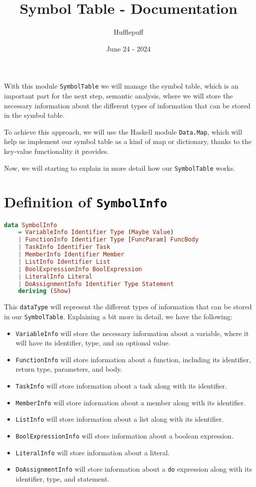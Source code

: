 \documentclass{article}
\title{Symbol Table - Documentation}
\author{Hufflepuff}
\date{June 24 - 2024}
\newcommand{\code}[1]{\colorbox{codebackground}{\texttt{#1}}}
\begin{document}
\maketitle

With this module \code{SymbolTable} we will manage the symbol table, which is an important part for the next step, semantic analysis, where we will store the necessary information about the different types of information that can be stored in the symbol table.

To achieve this approach, we will use the Haskell module \code{Data.Map}, which will help us implement our symbol table as a kind of map or dictionary, thanks to the key-value functionality it provides.

Now, we will starting to explain in more detail how our \code{SymbolTable} works.

\section{Definition of \code{SymbolInfo}}

\begin{lstlisting}[language=Haskell]
data SymbolInfo
    = VariableInfo Identifier Type (Maybe Value)
    | FunctionInfo Identifier Type [FuncParam] FuncBody
    | TaskInfo Identifier Task
    | MemberInfo Identifier Member
    | ListInfo Identifier List
    | BoolExpressionInfo BoolExpression
    | LiteralInfo Literal
    | DoAssignmentInfo Identifier Type Statement
    deriving (Show)
\end{lstlisting}

This \code{dataType} will represent the different types of information that can be stored in our \code{SymbolTable}. Explaining a bit more in detail, we have the following:

\begin{itemize}
    \item \texttt{VariableInfo} will store the necessary information about a variable, where it will have its identifier, type, and an optional value.
    \item \texttt{FunctionInfo} will store information about a function, including its identifier, return type, parameters, and body.
    \item \texttt{TaskInfo} will store information about a task along with its identifier.
    \item \texttt{MemberInfo} will store information about a member along with its identifier.
    \item \texttt{ListInfo} will store information about a list along with its identifier.
    \item \texttt{BoolExpressionInfo} will store information about a boolean expression.
    \item \texttt{LiteralInfo} will store information about a literal.
    \item \texttt{DoAssignmentInfo} will store information about a \code{do} expression along with its identifier, type, and statement.
\end{itemize}
\end{document}
